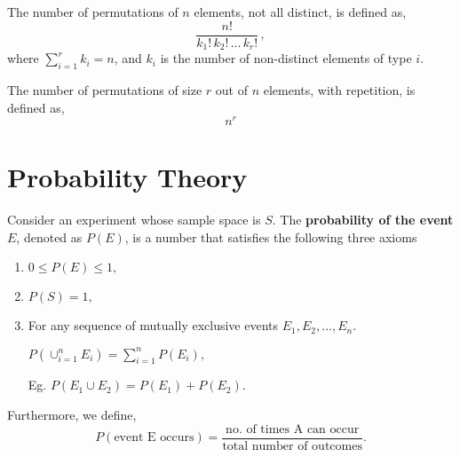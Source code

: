 \begin{defn}\label{mod2:defn:PermutationEqn2}
	The number of permutations of $n$ elements, not all distinct, is defined as,
	\begin{equation}
		\frac{n!}{{k_1}!\,{k_2}!\,...\,{k_r}!} \,,
	\end{equation}
	where  $\sum_{i=1}^{r} k_i = n$, and $k_i$ is the number of non-distinct elements of type $i$.
\end{defn}


\begin{defn}\label{mod2:defn:PermutationEqn3}
	The number of permutations of size $r$ out of $n$ elements, with repetition, is defined as,
	\begin{equation}
		n^r
	\end{equation}
\end{defn}




\section{Probability Theory}\label{mod2:section:ProbabilityTheory}


\begin{axiom}  \label{mod2:axiom:ProbabilityAxioms}
	Consider an experiment whose sample space is $S$. The \textbf{probability of the event $E$}, denoted as $P(E)$, is a number that satisfies the following three axioms	
	\begin{enumerate}[label = \bfseries (\arabic*)]
		\item 	$0 \leq P(E) \leq 1 , $ \label{mod2:axiom:ProbabilityAxiom:1}
				
			
		
		\item 	$	P(S) = 1, $ \label{mod2:axiom:ProbabilityAxiom:2}
				
			
		
		\item 	For any sequence of mutually exclusive events $E_1, E_2, ... , E_n$.
		
			
					$P\left( \cup_{i=1}^n E_i \right) = \sum_{i=1}^n P(E_i), $ \label{mod2:axiom:ProbabilityAxiom:3}
			
			
			
				Eg. $P(E_1 \cup E_2) = P(E_1)+P(E_2)$.
		
		
	\end{enumerate}
\end{axiom}


\begin{defn} \label{mod2:defn:Probability}
	Furthermore, we define,
	\begin{equation}
		P(\text{event E occurs}) = \frac{\text{no. of times A can occur}}{\text{total number of outcomes}}. 
	\end{equation}
\end{defn}



